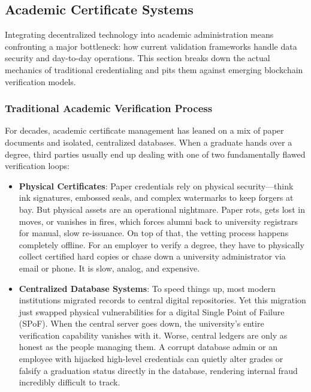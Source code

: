 \subsection{Academic Certificate Systems}

Integrating decentralized technology into academic administration means confronting a major bottleneck: how current validation frameworks handle data security and day-to-day operations. This section breaks down the actual mechanics of traditional credentialing and pits them against emerging blockchain verification models.

\subsubsection{Traditional Academic Verification Process}

For decades, academic certificate management has leaned on a mix of paper documents and isolated, centralized databases. When a graduate hands over a degree, third parties usually end up dealing with one of two fundamentally flawed verification loops:

\begin{itemize}
    \item \textbf{Physical Certificates}: Paper credentials rely on physical security—think ink signatures, embossed seals, and complex watermarks to keep forgers at bay. But physical assets are an operational nightmare. Paper rots, gets lost in moves, or vanishes in fires, which forces alumni back to university registrars for manual, slow re-issuance. On top of that, the vetting process happens completely offline. For an employer to verify a degree, they have to physically collect certified hard copies or chase down a university administrator via email or phone. It is slow, analog, and expensive.

          

    \item \textbf{Centralized Database Systems}: To speed things up, most modern institutions migrated records to central digital repositories. Yet this migration just swapped physical vulnerabilities for a digital Single Point of Failure (SPoF)\cite{yuan2014testing}. When the central server goes down, the university's entire verification capability vanishes with it. Worse, central ledgers are only as honest as the people managing them. A corrupt database admin or an employee with hijacked high-level credentials can quietly alter grades or falsify a graduation status directly in the database, rendering internal fraud incredibly difficult to track.

\end{itemize}

